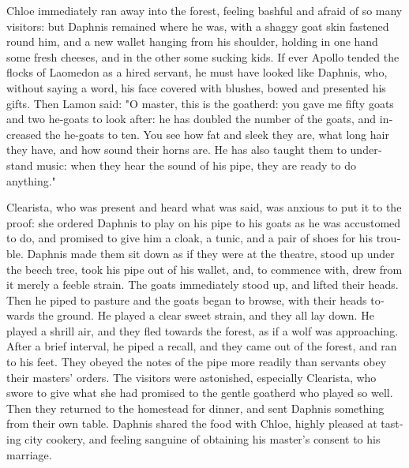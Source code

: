 \documentclass{book}
\begin{document}
\begin{pairs}
\begin{Rightside}
\begin{english}
  Chloe immediately ran away into the forest, feeling bashful and afraid of so many visitors: but Daphnis remained where he was, with a shaggy goat skin fastened round him, and a new wallet hanging from his shoulder, holding in one hand some fresh cheeses, and in the other some sucking kids.  If ever Apollo tended the flocks of Laomedon as a hired servant, he must have looked like Daphnis, who, without saying a word, his face covered with blushes, bowed and presented his gifts.  Then Lamon said: "O master, this is the goatherd: you gave me fifty goats and two he-goats to look after: he has doubled the number of the goats, and increased the he-goats to ten.  You see how fat and sleek they are, what long hair they have, and how sound their horns are.  He has also taught them to understand music: when they hear the sound of his pipe, they are ready to do anything."
\pend


  Clearista, who was present and heard what was said, was anxious to put it to the proof: she ordered Daphnis to play on his pipe to his goats as he was accustomed to do, and promised to give him a cloak, a tunic, and a pair of shoes for his trouble.  Daphnis made them sit down as if they were at the theatre, stood up under the beech tree, took his pipe out of his wallet, and, to commence with, drew from it merely a feeble strain.  The goats immediately stood up, and lifted their heads.  Then he piped to pasture and the goats began to browse, with their heads towards the ground.  He played a clear sweet strain, and they all lay down.  He played a shrill air, and they fled towards the forest, as if a wolf was approaching.  After a brief interval, he piped a recall, and they came out of the forest, and ran to his feet.  They obeyed the notes of the pipe more readily than servants obey their masters' orders.  The visitors were astonished, especially Clearista, who swore to give what she had promised to the gentle goatherd who played so well.  Then they returned to the homestead for dinner, and sent Daphnis something from their own table.  Daphnis shared the food with Chloe, highly pleased at tasting city cookery, and feeling sanguine of obtaining his master's consent to his marriage.
\pend



\end{english}
\end{Rightside}
\end{pairs}
\end{document}
